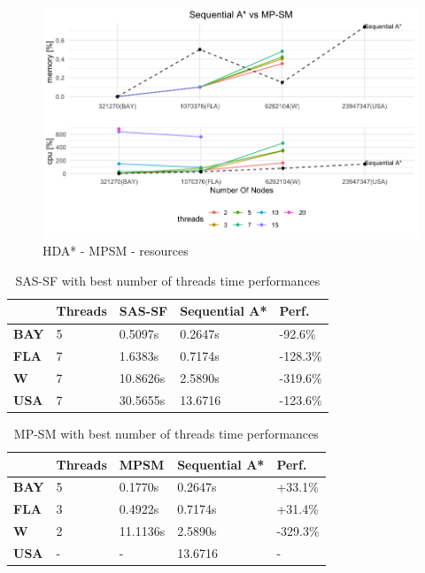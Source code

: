 \documentclass[twocolumn, switch]{article} %
\begin{document}
\begin{figure}[ht!]
  \centering
  \includegraphics[width=1\linewidth]{hda/seq_mpsm_cpumem.png}
  \caption{HDA* - MPSM - resources}
  \label{hdabaympsmcpumem}
\end{figure}
\begin{table}[ht!]
  \centering
  \caption{SAS-SF with best number of threads time performances}
  \begin{tabular}{|l|l|l|l|l|}
  \hline
  \textbf{}    & \textbf{Threads} & \textbf{SAS-SF} & \textbf{Sequential A*} & \textbf{Perf.}\\ \hline
  \textbf{BAY} & 5        & 0.5097s                & 0.2647s  &-92.6\%          \\ \hline
  \textbf{FLA} & 7        & 1.6383s                & 0.7174s  &-128.3\%          \\ \hline
  \textbf{W}   & 7        & 10.8626s                & 2.5890s &-319.6\%           \\ \hline
  \textbf{USA} & 7         & 30.5655s               & 13.6716 &-123.6\%           \\ \hline
  \end{tabular}
  \label{tablesas}
\end{table}
\begin{table}[ht!]
  \centering
  \caption{MP-SM with best number of threads time performances}
  \begin{tabular}{|l|l|l|l|l|}
  \hline
  \textbf{}    & \textbf{Threads} & \textbf{MPSM} & \textbf{Sequential A*} & \textbf{Perf.}\\ \hline
  \textbf{BAY} & 5        & 0.1770s                & 0.2647s  &+33.1\%          \\ \hline
  \textbf{FLA} & 3        & 0.4922s                & 0.7174s  &+31.4\%          \\ \hline
  \textbf{W}   & 2        & 11.1136s                & 2.5890s &-329.3\%           \\ \hline
  \textbf{USA} & -         & -                      & 13.6716 &-           \\ \hline
  \end{tabular}
  \label{tablempsm}
\end{table}
\end{document}
